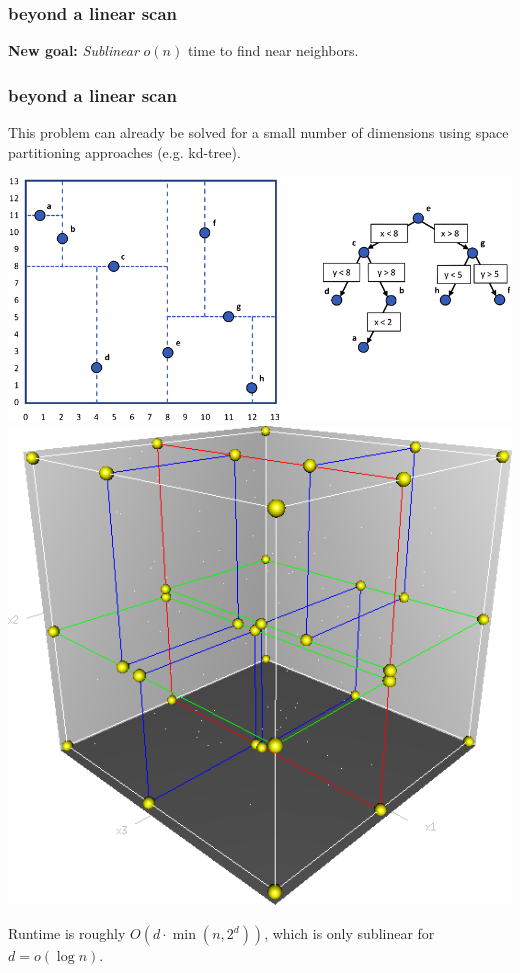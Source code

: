 \documentclass[compress]{beamer}
\begin{document}
\begin{frame}
	\frametitle{beyond a linear scan}
	\begin{center}
		\textbf{New goal:} \emph{Sublinear} $o(n)$ time to find near neighbors. 
	\end{center}
\end{frame}

\begin{frame}
	\frametitle{beyond a linear scan}	
	This problem can already be solved for a small number of dimensions using space partitioning approaches (e.g. kd-tree).
	
	\includegraphics[height=.4\textheight]{kdtree.png}	\includegraphics[height=.4\textheight]{3dtree.png}
	
	Runtime is roughly $O(d\cdot \min(n,2^d))$, which is only sublinear for $d = o(\log n)$.

\end{frame}
\end{document}
